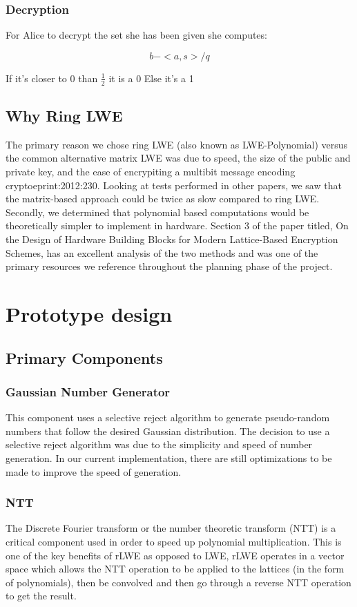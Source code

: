 \documentclass{article}
\begin{document}
\subsubsection{Decryption}
For Alice to decrypt the set she has been given she computes:

\begin{equation*}
b - <a,s>/q
\end{equation*}

If it’s closer to 0 than $\frac{1}{2}$ it is a 0
Else it’s a 1

\subsection{Why Ring LWE}
The primary reason we chose ring LWE (also known as LWE-Polynomial) versus the common alternative matrix LWE was due to speed, the size of the public and private key, and the ease of encrypiting a multibit message encoding {cryptoeprint:2012:230}. Looking at tests performed in other papers, we saw that the matrix-based approach could be twice as slow compared to ring LWE. Secondly, we determined that polynomial based computations would be theoretically simpler to implement in hardware. Section 3 of the paper titled, On the Design of Hardware Building Blocks for Modern Lattice-Based Encryption Schemes, has an excellent analysis of the two methods and was one of the primary resources we reference throughout the planning phase of the project.
\section{Prototype design}
\subsection{Primary Components}
\subsubsection{Gaussian Number Generator}
This component uses a selective reject algorithm to generate pseudo-random numbers that follow the desired Gaussian distribution.  The decision to use a selective reject algorithm was due to the simplicity and speed of number generation. In our current implementation, there are still optimizations to be made to improve the speed of generation.  
\subsubsection{NTT}
The Discrete Fourier transform or the number theoretic transform (NTT) is a critical component used in order to speed up polynomial multiplication. This is one of the key benefits of rLWE as opposed to LWE, rLWE operates in a vector space which allows the NTT operation to be applied to the lattices (in the form of polynomials), then be convolved and then go through a reverse NTT operation to get the result. 
\end{document}
